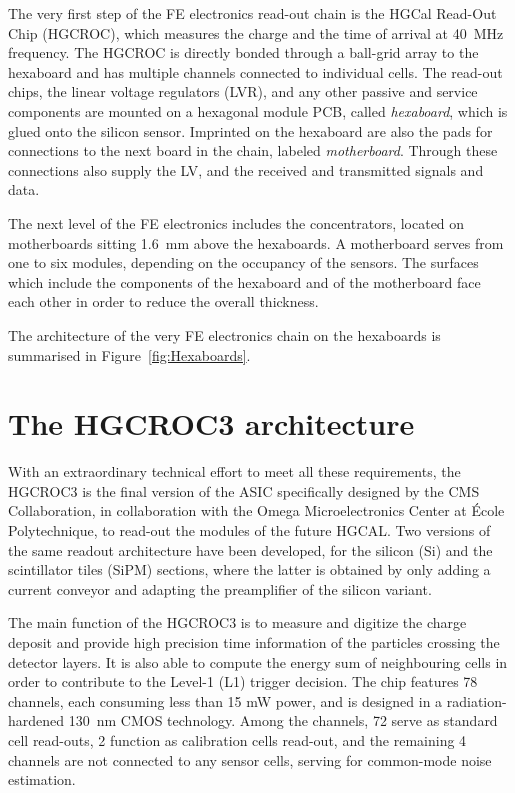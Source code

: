 \bigbreak

The very first step of the FE electronics read-out chain is the HGCal Read-Out Chip (HGCROC), which measures the charge and the time of arrival at 40~MHz frequency. The HGCROC is directly bonded through a ball-grid array to the hexaboard and has multiple channels connected to individual cells. 
The read-out chips, the linear voltage regulators (LVR), and any other passive and service components are mounted on a hexagonal module PCB, called \textit{hexaboard}, which is glued onto the silicon sensor. Imprinted on the hexaboard are also the pads for connections to the next board in the chain, labeled \textit{motherboard}. Through these connections also supply the LV, and the received and transmitted signals and data. 

\bigbreak

The next level of the FE electronics includes the concentrators, located on motherboards sitting 1.6~mm above the hexaboards. A motherboard serves from one to six modules, depending on the occupancy of the sensors. The surfaces which include the components of the hexaboard and of the motherboard face each other in order to reduce the overall thickness. 

The architecture of the very FE electronics chain on the hexaboards is summarised in Figure~\ref{fig:Hexaboards}. 

\section{The HGCROC3 architecture}
\label{sec:The HGCROC3 architecture}

With an extraordinary technical effort to meet all these requirements, the HGCROC3 is the final version of the ASIC specifically designed by the CMS Collaboration, in collaboration with the Omega Microelectronics Center at École Polytechnique, to read-out the modules of the future HGCAL. 
Two versions of the same readout architecture have been developed, for the silicon (Si) and the scintillator tiles (SiPM) sections, where the latter is obtained by only adding a current conveyor and adapting the preamplifier of the silicon variant.

\bigbreak

The main function of the HGCROC3 is to measure and digitize the charge deposit and provide high precision time information of the particles crossing the detector layers. It is also able to compute the energy sum of neighbouring cells in order to contribute to the Level-1 (L1) trigger decision. 
The chip features 78 channels, each consuming less than 15 mW power, and is designed in a radiation-hardened 130~nm CMOS technology. Among the channels, 72 serve as standard cell read-outs, 2 function as calibration cells read-out, and the remaining 4 channels are not connected to any sensor cells, serving for common-mode noise estimation. 

